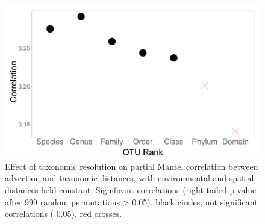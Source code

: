 \begin{figure}[!ht]
  \centering
  \includegraphics[width=\textwidth]{../advection/taxonomicresolution.png}
  \caption[Advection effect at different taxonomic resolutions]{Effect of taxonomic resolution on partial Mantel correlation between advection and taxonomic distances, with environmental and spatial distances held constant.
  Significant correlations (right-tailed p-value after 999 random permutations \textgreater{} 0.05), black circles; not significant correlations (\textlessthanorequal{} 0.05), red crosses.}
  \label{fig:taxonomicresolution}
\end{figure}
